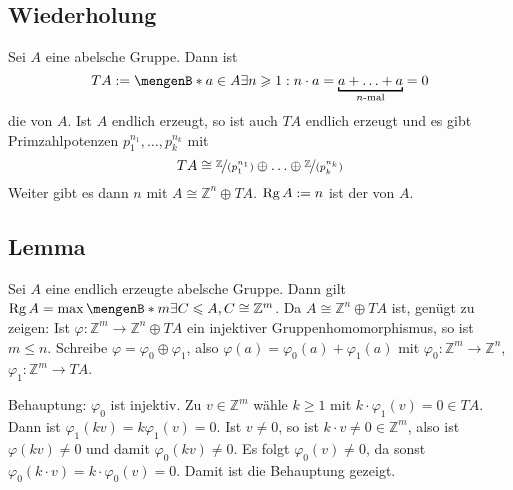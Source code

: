 \subsection[Wiederholung: Torsionsgruppe]{Wiederholung} %
\label{sub:41}
Sei $A$ eine abelsche Gruppe. Dann ist 
\[
	T A := \set[a \in A]{\exists n \ge 1 : n \cdot a = \underbracket[1pt][2pt]{a + \ldots + a}_{\text{$n$-mal}} = 0} 
\]
die  von $A$. Ist $A$ endlich erzeugt, so ist auch $TA$ endlich erzeugt und es gibt Primzahlpotenzen $p_1^{n_1}, \ldots , p_k^{n_k}$ mit
\[
	TA \cong \nicefrac{\mathds{Z}}{(p_1^{n_1})} \oplus \ldots \oplus \nicefrac{\mathds{Z}}{(p_k^{n_k})}
\]
Weiter gibt es dann $n$ mit $A \cong \mathds{Z}^n \oplus TA$. $\Rg A := n$ ist der  von $A$.

\subsection[Lemma: Rang einer endlich erzeugten abelschen Gruppe]{Lemma} %
\label{sub:42}
Sei $A$ eine endlich erzeugte abelsche Gruppe. Dann gilt $\Rg A = \max \set[m]{\exists C \le A, C \cong \mathds{Z}^m}$.
Da $A \cong \mathds{Z}^n \oplus T A$ ist, genügt zu zeigen: Ist $\varphi : \mathds{Z}^m \to \mathds{Z}^n \oplus T A$ ein injektiver Gruppenhomomorphismus, so ist $m \le n$.
Schreibe $\varphi = \varphi_0 \oplus \varphi_1$, also $\varphi(a) = \varphi_0(a) + \varphi_1(a)$ mit $\varphi_0 : \mathds{Z}^m \to \mathds{Z}^n$, 
$\varphi_1 : \mathds{Z}^m \to T A$. 

Behauptung: $\varphi_0$ ist injektiv. Zu $v \in \mathds{Z}^m$ wähle $k\ge 1$ mit $k \cdot \varphi_1(v) = 0 \in T A$. Dann ist $\varphi_1(k v) = k \varphi_1(v)=0$.
Ist $v \not= 0$, so ist $k \cdot v \not= 0 \in \mathds{Z}^m$, also ist $\varphi(k v) \not= 0$ und damit $\varphi_0(k v) \not= 0$. Es folgt $\varphi_0(v) \not= 0$, da sonst
$\varphi_0(k \cdot v) = k \cdot \varphi_0(v)= 0$. Damit ist die Behauptung gezeigt.

